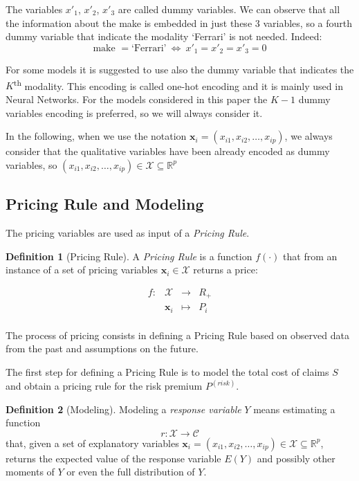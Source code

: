\documentclass[a4paper, twoside, openright, 12pt]{report}
\theoremstyle{definition}
\newtheorem{definition}{Definition}[chapter]
\theoremstyle{definition}
\theoremstyle{definition}
\theoremstyle{remark}
\begin{document}
The variables \(x'_1\), \(x'_2\), \(x'_3\) are called dummy variables. We can observe that all the information about the make is embedded in just these 3 variables, so a fourth dummy variable that indicate the modality `Ferrari' is not needed. Indeed:
\[
\text{make } = \text{`Ferrari'} \ \Longleftrightarrow \ x'_1=x'_2=x'_3=0
\]

For some models it is suggested to use also the dummy variable that indicates the \(K\)\textsuperscript{th} modality. This encoding is called one-hot encoding and it is mainly used in Neural Networks. For the models considered in this paper the \(K-1\) dummy variables encoding is preferred, so we will always consider it.

In the following, when we use the notation \(\boldsymbol{x}_i=(x_{i1}, x_{i2}, \dots, x_{ip})\), we always consider that the qualitative variables have been already encoded as dummy variables, so \((x_{i1}, x_{i2}, \dots, x_{ip})\in \mathcal{X} \subseteq \mathbb{R}^p\)

\hypertarget{pricing-rule-and-modeling}{%
\subsection{Pricing Rule and Modeling}\label{pricing-rule-and-modeling}}

The pricing variables are used as input of a \emph{Pricing Rule}.

\begin{definition}[Pricing Rule]
\label{def:pricing-rule} \iffalse (Pricing Rule) \fi{} A \emph{Pricing Rule} is a function \(f(\cdot)\) that from an instance of a set of pricing variables \(\boldsymbol{x}_i\in\mathcal{X}\) returns a price:

\[  
\begin{array}{rccl}
f: & \mathcal{X}      & \longrightarrow  & R_+ \\
   & \boldsymbol{x}_i & \longmapsto      & P_i \\
\end{array}
\]
\end{definition}

The process of pricing consists in defining a Pricing Rule based on observed data from the past and assumptions on the future.

The first step for defining a Pricing Rule is to model the total cost of claims \(S\) and obtain a pricing rule for the risk premium \(P^{(risk)}\).

\begin{definition}[Modeling]
\label{def:modeling} \iffalse (Modeling) \fi{} Modeling a \emph{response variable} \(Y\) means estimating a function
\[r:\mathcal{X}\rightarrow \mathcal{C}\]
that, given a set of explanatory variables \(\boldsymbol{x}_i=(x_{i1}, x_{i2}, \dots, x_{ip})\in \mathcal{X} \subseteq \mathbb{R}^p\), returns the expected value of the response variable \(E(Y)\) and possibly other moments of \(Y\) or even the full distribution of \(Y\).
\end{definition}
\end{document}
